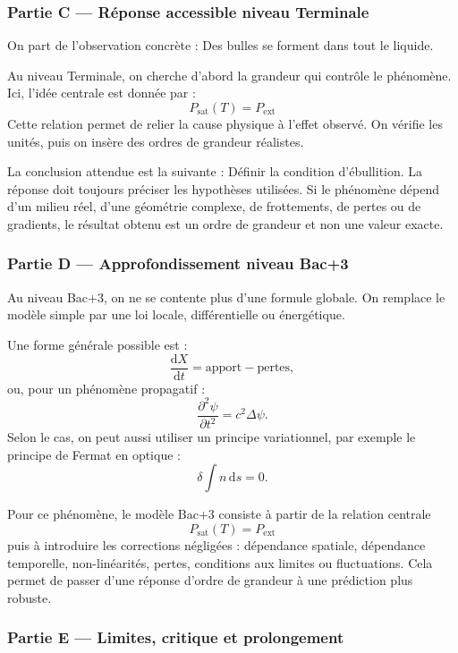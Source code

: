 \documentclass[11pt,a4paper]{article}
\begin{document}
\subsubsection*{Partie C — Réponse accessible niveau Terminale}

\begin{corrigebox}
On part de l'observation concrète : Des bulles se forment dans tout le liquide.

Au niveau Terminale, on cherche d'abord la grandeur qui contrôle le phénomène. Ici, l'idée centrale est donnée par :
\[
P_{\mathrm{sat}}(T)=P_{\mathrm{ext}}
\]
Cette relation permet de relier la cause physique à l'effet observé. On vérifie les unités, puis on insère des ordres de grandeur réalistes.

La conclusion attendue est la suivante : Définir la condition d'ébullition. La réponse doit toujours préciser les hypothèses utilisées. Si le phénomène dépend d'un milieu réel, d'une géométrie complexe, de frottements, de pertes ou de gradients, le résultat obtenu est un ordre de grandeur et non une valeur exacte.
\end{corrigebox}

\subsubsection*{Partie D — Approfondissement niveau Bac+3}

\begin{approfondissementbox}
Au niveau Bac+3, on ne se contente plus d'une formule globale. On remplace le modèle simple par une loi locale, différentielle ou énergétique.

Une forme générale possible est :
\[
\frac{\mathrm d X}{\mathrm dt}=\text{apport}-\text{pertes},
\]
ou, pour un phénomène propagatif :
\[
\frac{\partial^2 \psi}{\partial t^2}=c^2\Delta\psi.
\]
Selon le cas, on peut aussi utiliser un principe variationnel, par exemple le principe de Fermat en optique :
\[
\delta \int n\,\mathrm ds=0.
\]

Pour ce phénomène, le modèle Bac+3 consiste à partir de la relation centrale
\[
P_{\mathrm{sat}}(T)=P_{\mathrm{ext}}
\]
puis à introduire les corrections négligées : dépendance spatiale, dépendance temporelle, non-linéarités, pertes, conditions aux limites ou fluctuations. Cela permet de passer d'une réponse d'ordre de grandeur à une prédiction plus robuste.
\end{approfondissementbox}

\subsubsection*{Partie E — Limites, critique et prolongement}
\end{document}
